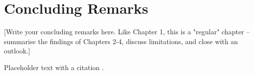 \documentclass[../main.tex]{subfiles}
\begin{document}
\chapter{Concluding Remarks}
[Write your concluding remarks here. Like Chapter 1, this is a "regular"
chapter -- summarise the findings of Chapters 2-4, discuss limitations, and
close with an outlook.]

Placeholder text with a citation \cite{Placeholder2022Preprint}.
\end{document}
